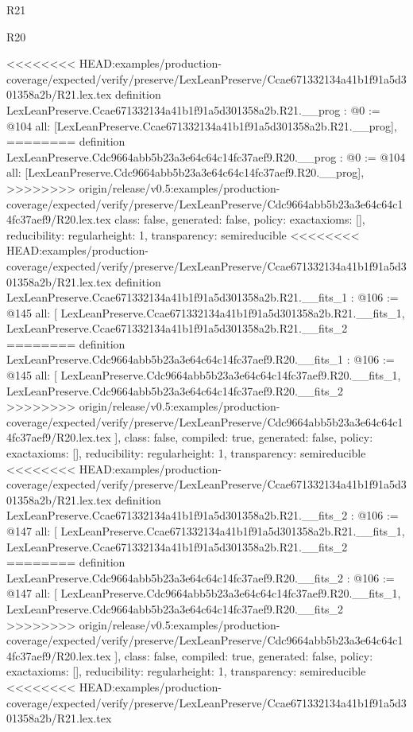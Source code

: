 \begin{lexlean}{R21}
\begin{lexlean}{R20}
\begin{coremodule}
<<<<<<<< HEAD:examples/production-coverage/expected/verify/preserve/LexLeanPreserve/Ccae671332134a41b1f91a5d301358a2b/R21.lex.tex
definition LexLeanPreserve.Ccae671332134a41b1f91a5d301358a2b.R21.__prog : @0 := @104 {
  all: [LexLeanPreserve.Ccae671332134a41b1f91a5d301358a2b.R21.__prog],
========
definition LexLeanPreserve.Cdc9664abb5b23a3e64c64c14fc37aef9.R20.__prog : @0 := @104 {
  all: [LexLeanPreserve.Cdc9664abb5b23a3e64c64c14fc37aef9.R20.__prog],
>>>>>>>> origin/release/v0.5:examples/production-coverage/expected/verify/preserve/LexLeanPreserve/Cdc9664abb5b23a3e64c64c14fc37aef9/R20.lex.tex
  class: false,
  generated: false,
  policy: exact{axioms: []},
  reducibility: regular{height: 1},
  transparency: semireducible
}
<<<<<<<< HEAD:examples/production-coverage/expected/verify/preserve/LexLeanPreserve/Ccae671332134a41b1f91a5d301358a2b/R21.lex.tex
definition LexLeanPreserve.Ccae671332134a41b1f91a5d301358a2b.R21.__fits_1 : @106 := @145 {
  all: [
    LexLeanPreserve.Ccae671332134a41b1f91a5d301358a2b.R21.__fits_1,
    LexLeanPreserve.Ccae671332134a41b1f91a5d301358a2b.R21.__fits_2
========
definition LexLeanPreserve.Cdc9664abb5b23a3e64c64c14fc37aef9.R20.__fits_1 : @106 := @145 {
  all: [
    LexLeanPreserve.Cdc9664abb5b23a3e64c64c14fc37aef9.R20.__fits_1,
    LexLeanPreserve.Cdc9664abb5b23a3e64c64c14fc37aef9.R20.__fits_2
>>>>>>>> origin/release/v0.5:examples/production-coverage/expected/verify/preserve/LexLeanPreserve/Cdc9664abb5b23a3e64c64c14fc37aef9/R20.lex.tex
  ],
  class: false,
  compiled: true,
  generated: false,
  policy: exact{axioms: []},
  reducibility: regular{height: 1},
  transparency: semireducible
}
<<<<<<<< HEAD:examples/production-coverage/expected/verify/preserve/LexLeanPreserve/Ccae671332134a41b1f91a5d301358a2b/R21.lex.tex
definition LexLeanPreserve.Ccae671332134a41b1f91a5d301358a2b.R21.__fits_2 : @106 := @147 {
  all: [
    LexLeanPreserve.Ccae671332134a41b1f91a5d301358a2b.R21.__fits_1,
    LexLeanPreserve.Ccae671332134a41b1f91a5d301358a2b.R21.__fits_2
========
definition LexLeanPreserve.Cdc9664abb5b23a3e64c64c14fc37aef9.R20.__fits_2 : @106 := @147 {
  all: [
    LexLeanPreserve.Cdc9664abb5b23a3e64c64c14fc37aef9.R20.__fits_1,
    LexLeanPreserve.Cdc9664abb5b23a3e64c64c14fc37aef9.R20.__fits_2
>>>>>>>> origin/release/v0.5:examples/production-coverage/expected/verify/preserve/LexLeanPreserve/Cdc9664abb5b23a3e64c64c14fc37aef9/R20.lex.tex
  ],
  class: false,
  compiled: true,
  generated: false,
  policy: exact{axioms: []},
  reducibility: regular{height: 1},
  transparency: semireducible
}
<<<<<<<< HEAD:examples/production-coverage/expected/verify/preserve/LexLeanPreserve/Ccae671332134a41b1f91a5d301358a2b/R21.lex.tex
}}}
\end{coremodule}
\end{lexlean}
\end{lexlean}
